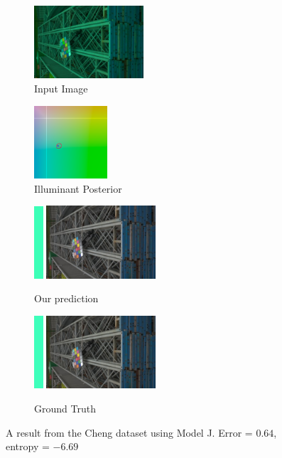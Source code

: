 \documentclass[10pt,twocolumn,letterpaper]{article}
\begin{document}
\begin{figure}[!]
\centering
  \begin{subfigure}[!]{1.7in}
    \includegraphics[width=1.6in]{figures/results/cheng/00000122_input.jpg}
    \caption{\footnotesize Input Image}
  \end{subfigure}
  \begin{subfigure}[!]{1.17in}
    \includegraphics[width=1.07in]{figures/results/cheng/00000122_chroma.png}
    \caption{\footnotesize Illuminant Posterior}
  \end{subfigure}
\begin{subfigure}[!]{1.9in}
    \includegraphics[width=0.133in]{figures/results/cheng/00000122_illum.png}\!
    \includegraphics[width=1.6in]{figures/results/cheng/00000122_prediction.jpg}
    \caption{\footnotesize Our prediction}
  \end{subfigure}
  \begin{subfigure}[!]{1.9in}
    \includegraphics[width=0.133in]{figures/results/cheng/00000122_illum_true.png}\!
    \includegraphics[width=1.6in]{figures/results/cheng/00000122_true.jpg}
    \caption{\footnotesize Ground Truth}
  \end{subfigure}
  \caption{
    A result from the Cheng dataset using Model J. Error = $0.64$\textdegree, entropy = $-6.69$
    \label{fig:results12}
  }
\end{figure}
\end{document}

